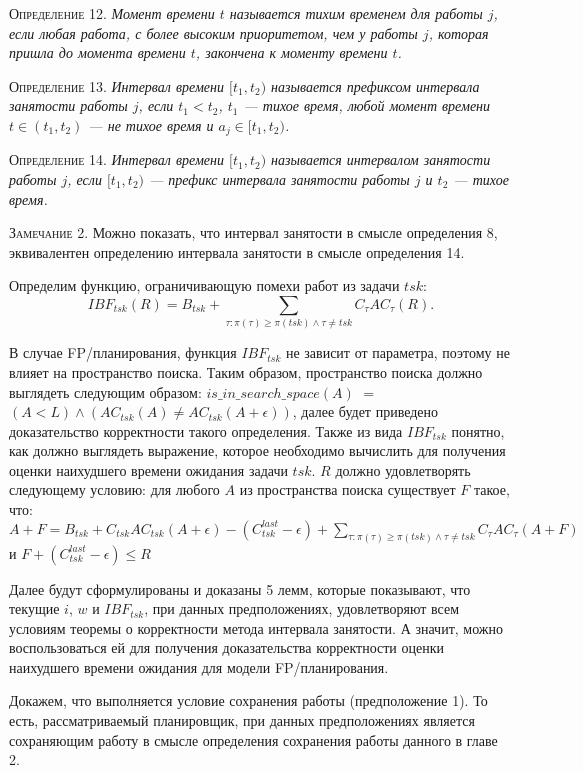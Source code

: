 \textsc{Определение 12.}
\textit{Момент времени $t$ называется тихим временем для работы $j$, если
  любая работа, с более высоким приоритетом, чем у работы $j$,
  которая пришла до момента времени $t$, закончена к моменту времени $t$. }

\textsc{Определение 13.}
\textit{Интервал времени $[t_1, t_2)$ называется префиксом интервала занятости работы $j$,
  если $t_1 < t_2$, $t_1$ --- тихое время, любой момент времени $t \in (t_1, t_2)$ --- не тихое время и
  $a_{j} \in [t_1, t_2)$. }

\textsc{Определение 14.}
\textit{Интервал времени $[t_1, t_2)$ называется интервалом занятости работы $j$,
  если $[t_1, t_2)$ --- префикс интервала занятости работы $j$ и $t_2$ --- тихое время. }

\textsc{Замечание 2.} Можно показать, что интервал занятости в смысле определения 8,
  эквивалентен определению интервала занятости в смысле определения 14.

Определим функцию, ограничивающую помехи работ из задачи $tsk$:
  $$IBF_{tsk}(R) = B_{tsk} + \sum_{\tau:\pi(\tau) \geq \pi(tsk) \wedge \tau \neq tsk} C_{\tau}AC_{\tau}(R).$$


В случае FP\-/планирования, функция $IBF_{tsk}$ не зависит от параметра, поэтому
  не влияет на пространство поиска. Таким образом, пространство поиска должно выглядеть следующим
  образом: $is\_in\_search\_space(A)$ $=$ $(A < L) \wedge (AC_{tsk}(A) \neq AC_{tsk}(A + \epsilon))$,
  далее будет приведено доказательство корректности такого определения.
  Также из вида $IBF_{tsk}$ понятно, как должно выглядеть выражение, которое необходимо
  вычислить для получения оценки наихудшего времени ожидания задачи $tsk$.
  $R$ должно удовлетворять следующему условию: для любого $A$ из пространства поиска
  существует $F$ такое, что: $A + F = B_{tsk} +  C_{tsk}AC_{tsk}(A + \epsilon) - (C_{tsk}^{last} - \epsilon) +
    \sum_{\tau:\pi(\tau) \geq \pi(tsk) \wedge \tau \neq tsk} C_{\tau}AC_{\tau}(A+F)$ и $F + (C_{tsk}^{last} - \epsilon) \leq R$

Далее будут сформулированы и доказаны 5 лемм, которые показывают, что
  текущие $i$, $w$ и $IBF_{tsk}$, при данных предположениях, удовлетворяют всем условиям
  теоремы о корректности метода интервала занятости. А значит, можно воспользоваться ей
  для получения доказательства корректности оценки наихудшего времени ожидания для модели FP\-/планирования.

Докажем, что выполняется условие сохранения работы (предположение 1).
  То есть, рассматриваемый планировщик, при данных предположениях является
  сохраняющим работу в смысле определения сохранения работы данного в главе 2.


